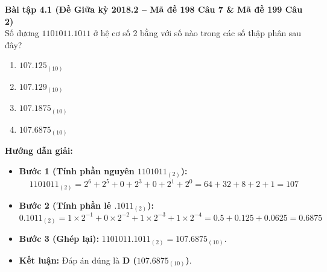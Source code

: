 \textbf{Bài tập 4.1 (Đề Giữa kỳ 2018.2 -- Mã đề 198 Câu 7 \& Mã đề 199 Câu 2)}\\
Số dương $1101011.1011$ ở hệ cơ số 2 bằng với số nào trong các số thập phân sau đây?
\begin{enumerate}[label=\Alph*.]
    \item $107.125_{(10)}$
    \item $107.129_{(10)}$
    \item $107.1875_{(10)}$
    \item $107.6875_{(10)}$
\end{enumerate}
\textbf{Hướng dẫn giải:}
\begin{itemize}
    \item \textbf{Bước 1 (Tính phần nguyên $1101011_{(2)}$):}
    $$1101011_{(2)} = 2^6 + 2^5 + 0 + 2^3 + 0 + 2^1 + 2^0 = 64 + 32 + 8 + 2 + 1 = 107$$
    \item \textbf{Bước 2 (Tính phần lẻ $.1011_{(2)}$):}
    $$0.1011_{(2)} = 1 \times 2^{-1} + 0 \times 2^{-2} + 1 \times 2^{-3} + 1 \times 2^{-4} = 0.5 + 0.125 + 0.0625 = 0.6875$$
    \item \textbf{Bước 3 (Ghép lại):} $1101011.1011_{(2)} = 107.6875_{(10)}$.
    \item \textbf{Kết luận:} Đáp án đúng là \textbf{D ($107.6875_{(10)}$)}.
\end{itemize}

